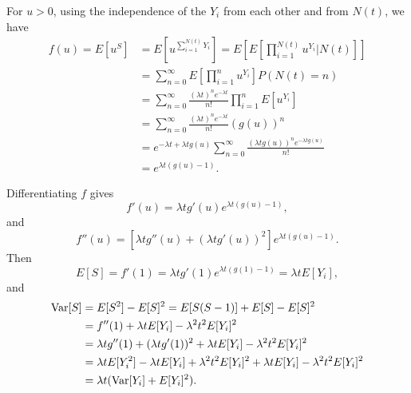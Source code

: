 \documentclass{homework}
\begin{document}
	
	\question 
	\begin{alphaparts}
		\questionpart For $u > 0$, using the independence of the $Y_i$ from each other and from $N(t)$, we have
		\begin{align*}
			f(u) = E\left[u^S\right] &= E\left[u^{\sum\limits_{i=1}^{N(t)}Y_i}\right] = E\left[ E\left[\prod_{i=1}^{N(t)}u^{Y_i} \bigg\vert N(t)\right]\right]\\
			&= \sum_{n=0}^\infty E\left[\prod_{i=1}^n u^{Y_i}\right]P(N(t) = n) \\
			&= \sum_{n=0}^\infty \frac{(\lambda t)^n e^{-\lambda t}}{n!} \prod_{i=1}^n E[u^{Y_i}] \\
			&= \sum_{n=0}^\infty \frac{(\lambda t)^n e^{-\lambda t}}{n!} (g(u))^n \\
			&= e^{-\lambda t + \lambda t g(u)} \sum_{n=0}^\infty \frac{(\lambda t g(u))^ne^{-\lambda t g(u)}}{n!} \\
			&= e^{\lambda t (g(u) - 1)}.
		\end{align*}
		
		\questionpart Differentiating $f$ gives
		\begin{equation*}
			f'(u) = \lambda t g'(u)e^{\lambda t (g(u) - 1)},
		\end{equation*}
		and
		\begin{equation*}
			f''(u) = \left[\lambda t g''(u)+ (\lambda t g'(u))^2\right]e^{\lambda t (g(u)-1)}.
		\end{equation*}
		Then 
		\begin{equation*}
			E[S] = f'(1) = \lambda t g'(1)e^{\lambda t (g(1) - 1)} = \lambda t E[Y_i],
		\end{equation*}
		and
		\begin{align*}
			\mathrm{Var}[S] &= E[S^2] - E[S]^2 = E[S(S-1)] + E[S] - E[S]^2 \\
			&= f''(1) + \lambda t E[Y_i] - \lambda^2t^2 E[Y_i]^2 \\
			&= \lambda t g''(1) + (\lambda t g'(1))^2 + \lambda tE[Y_i] - \lambda^2 t^2 E[Y_i]^2 \\
			&= \lambda t E[Y_i^2] - \lambda t E[Y_i] + \lambda^2t^2 E[Y_i]^2 + \lambda t E[Y_i] - \lambda^2 t^2 E[Y_i]^2\\
			&= \lambda t (\mathrm{Var}[Y_i] + E[Y_i]^2).
		\end{align*}
	\end{alphaparts}
	
\end{document}
